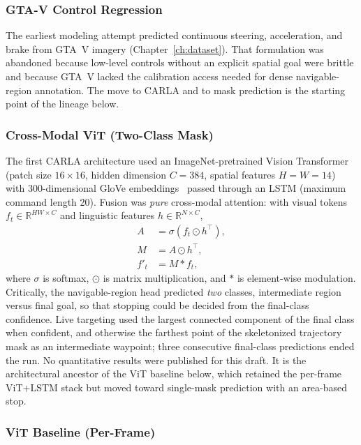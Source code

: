 \subsubsection{GTA-V Control Regression}

The earliest modeling attempt predicted continuous steering, acceleration, and brake from GTA~V imagery (Chapter~\ref{ch:dataset}). That formulation was abandoned because low-level controls without an explicit spatial goal were brittle and because GTA~V lacked the calibration access needed for dense navigable-region annotation. The move to CARLA and to mask prediction is the starting point of the lineage below.

\subsubsection{Cross-Modal ViT (Two-Class Mask)}

The first CARLA architecture used an ImageNet-pretrained Vision Transformer~\cite{dosovitskiy2020image} (patch size $16\times 16$, hidden dimension $C=384$, spatial features $H=W=14$) with 300-dimensional GloVe embeddings~\cite{pennington2014glove} passed through an LSTM (maximum command length 20). Fusion was \emph{pure} cross-modal attention: with visual tokens $f_t\in\mathbb{R}^{HW\times C}$ and linguistic features $h\in\mathbb{R}^{N\times C}$,
\begin{equation}
\begin{split}
    A &= \sigma(f_t \odot h^\top),\\
    M &= A \odot h^\top,\\
    f'_t &= M \ast f_t,
\end{split}
\end{equation}
where $\sigma$ is softmax, $\odot$ is matrix multiplication, and $\ast$ is element-wise modulation. Critically, the navigable-region head predicted \emph{two} classes, intermediate region versus final goal, so that stopping could be decided from the final-class confidence. Live targeting used the largest connected component of the final class when confident, and otherwise the farthest point of the skeletonized trajectory mask as an intermediate waypoint; three consecutive final-class predictions ended the run. No quantitative results were published for this draft. It is the architectural ancestor of the ViT baseline below, which retained the per-frame ViT+LSTM stack but moved toward single-mask prediction with an area-based stop.

\subsubsection{ViT Baseline (Per-Frame)}

